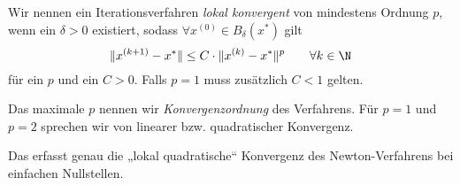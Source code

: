 \documentclass[11pt]{scrbook}
\begin{document}
\begin{df}[Konvergenzordnung] \label{3.11}
	Wir nennen ein Iterationsverfahren \emph{lokal konvergent} von mindestens Ordnung $p$, wenn ein $\delta > 0$ existiert, sodass $\forall x^{(0)} \in B_\delta(x^*)$ gilt
	\[
		\|x^{(k+1)} - x^*\| \le C \cdot \|x^{(k)} - x^*\|^p
		\qquad \forall k\in \N
	\]
	für ein $p$ und ein $C > 0$.
	Falls $p=1$ muss zusätzlich $C < 1$ gelten.

	Das maximale $p$ nennen wir \emph{Konvergenzordnung} des Verfahrens.
	Für $p=1$ und $p=2$ sprechen wir von linearer bzw. quadratischer Konvergenz.
	\begin{note}
		Das erfasst genau die „lokal quadratische“ Konvergenz des Newton-Verfahrens bei einfachen Nullstellen.
	\end{note}
\end{df}
\end{document}
